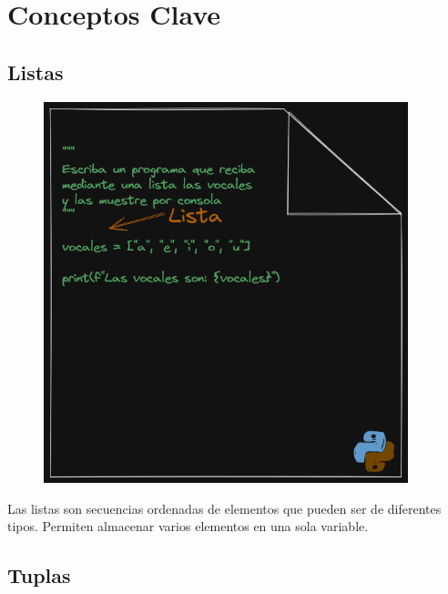 \documentclass[
  a4paper,
  DIV=11,
  numbers=noendperiod,
  onepage,
  openany]{scrreprt}
\begin{document}
\section{Conceptos Clave}\label{conceptos-clave-8}

\subsection{Listas}\label{listas}

\begin{figure}

{\centering \includegraphics[width=4.16667in,height=\textheight]{unidades/unidad3/images/vocales.png}

}

\end{figure}

Las listas son secuencias ordenadas de elementos que pueden ser de
diferentes tipos. Permiten almacenar varios elementos en una sola
variable.

\subsection{Tuplas}\label{tuplas}
\end{document}
